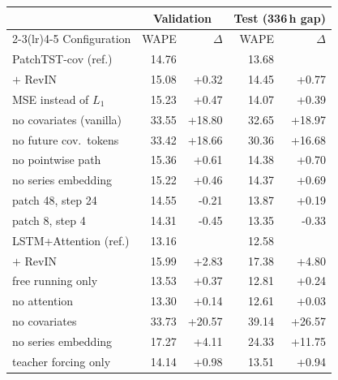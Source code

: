\begin{tabular}{lrrrr}
\toprule
& \multicolumn{2}{c}{Validation} & \multicolumn{2}{c}{Test (336\,h gap)} \\
\cmidrule(lr){2-3}\cmidrule(lr){4-5}
Configuration & WAPE & $\Delta$ & WAPE & $\Delta$ \\
\midrule
PatchTST-cov (ref.) & 14.76 & & 13.68 & \\
\quad $+$ RevIN & 15.08 & +0.32 & 14.45 & +0.77 \\
\quad MSE instead of $L_1$ & 15.23 & +0.47 & 14.07 & +0.39 \\
\quad no covariates (vanilla) & 33.55 & +18.80 & 32.65 & +18.97 \\
\quad no future cov.\ tokens & 33.42 & +18.66 & 30.36 & +16.68 \\
\quad no pointwise path & 15.36 & +0.61 & 14.38 & +0.70 \\
\quad no series embedding & 15.22 & +0.46 & 14.37 & +0.69 \\
\quad patch 48, step 24 & 14.55 & -0.21 & 13.87 & +0.19 \\
\quad patch 8, step 4 & 14.31 & -0.45 & 13.35 & -0.33 \\
\midrule
LSTM+Attention (ref.) & 13.16 & & 12.58 & \\
\quad $+$ RevIN & 15.99 & +2.83 & 17.38 & +4.80 \\
\quad free running only & 13.53 & +0.37 & 12.81 & +0.24 \\
\quad no attention & 13.30 & +0.14 & 12.61 & +0.03 \\
\quad no covariates & 33.73 & +20.57 & 39.14 & +26.57 \\
\quad no series embedding & 17.27 & +4.11 & 24.33 & +11.75 \\
\quad teacher forcing only & 14.14 & +0.98 & 13.51 & +0.94 \\
\bottomrule
\end{tabular}
